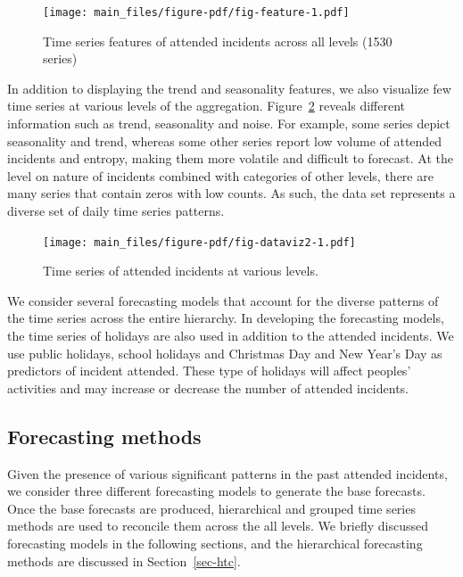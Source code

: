 \documentclass[
  authoryear,
  preprint,
  3p]{elsarticle}
\begin{document}
\begin{figure}

{\centering \texttt{[image: main\_files/figure-pdf/fig-feature-1.pdf]}

}

\caption{\label{fig-feature}Time series features of attended incidents
across all levels (1530 series)}

\end{figure}

In addition to displaying the trend and seasonality features, we also
visualize few time series at various levels of the aggregation.
Figure~\ref{fig-dataviz2} reveals different information such as trend,
seasonality and noise. For example, some series depict seasonality and
trend, whereas some other series report low volume of attended incidents
and entropy, making them more volatile and difficult to forecast. At the
level on nature of incidents combined with categories of other levels,
there are many series that contain zeros with low counts. As such, the
data set represents a diverse set of daily time series patterns.

\begin{figure}

{\centering \texttt{[image: main\_files/figure-pdf/fig-dataviz2-1.pdf]}

}

\caption{\label{fig-dataviz2}Time series of attended incidents at
various levels.}

\end{figure}

We consider several forecasting models that account for the diverse
patterns of the time series across the entire hierarchy. In developing
the forecasting models, the time series of holidays are also used in
addition to the attended incidents. We use public holidays, school
holidays and Christmas Day and New Year's Day as predictors of incident
attended. These type of holidays will affect peoples' activities and may
increase or decrease the number of attended incidents.

\hypertarget{forecasting-methods}{%
\subsection{Forecasting methods}\label{forecasting-methods}}

Given the presence of various significant patterns in the past attended
incidents, we consider three different forecasting models to generate
the base forecasts. Once the base forecasts are produced, hierarchical
and grouped time series methods are used to reconcile them across the
all levels. We briefly discussed forecasting models in the following
sections, and the hierarchical forecasting methods are discussed in
Section~\ref{sec-htc}.
\end{document}
